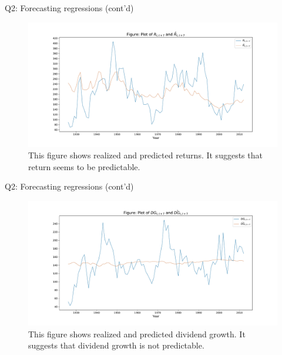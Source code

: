 \documentclass[10pt,t]{beamer}
\begin{document}
\begin{frame}{Q2: Forecasting regressions (cont'd)}
\begin{figure}[h!]
\centering
\includegraphics[width=\linewidth]{q2fig1.pdf}
\caption{This figure shows realized and predicted returns. It suggests that return seems to be predictable.}
\end{figure}
\end{frame}

\begin{frame}{Q2: Forecasting regressions (cont'd)}
\begin{figure}[h!]
\centering
\includegraphics[width=\linewidth]{q2fig2.pdf}
\caption{This figure shows realized and predicted dividend growth. It suggests that dividend growth is not predictable.}
\end{figure}
\end{frame}
\end{document}
